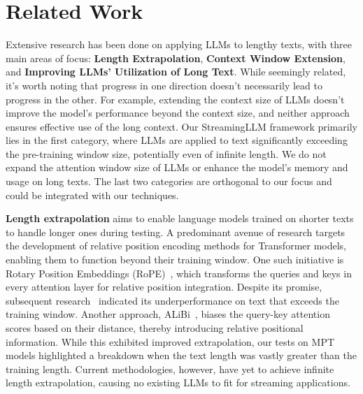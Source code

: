 \documentclass{article} \usepackage{iclr2024_conference,times}
\def\method{StreamingLLM\xspace}
\begin{document}
\section{Related Work}
\vspace{-0.5em}
Extensive research has been done on applying LLMs to lengthy texts, with three main areas of focus: \textbf{Length Extrapolation}, \textbf{Context Window Extension}, and \textbf{Improving LLMs' Utilization of Long Text}. While seemingly related, it's worth noting that progress in one direction doesn't necessarily lead to progress in the other. For example, extending the context size of LLMs doesn't improve the model's performance beyond the context size, and neither approach ensures effective use of the long context. Our \method framework primarily lies in the first category, where LLMs are applied to text significantly exceeding the pre-training window size, potentially even of infinite length. We do not expand the attention window size of LLMs or enhance the model's memory and usage on long texts. The last two categories are orthogonal to our focus and could be integrated with our techniques.

\textbf{Length extrapolation} aims to enable language models trained on shorter texts to handle longer ones during testing. A predominant avenue of research targets the development of relative position encoding methods for Transformer models, enabling them to function beyond their training window. One such initiative is Rotary Position Embeddings (RoPE)~\citep{su2021roformer}, which transforms the queries and keys in every attention layer for relative position integration. Despite its promise, subsequent research~\citep{alibi, chen2023extending} indicated its underperformance on text that exceeds the training window. Another approach, ALiBi~\citep{alibi}, biases the query-key attention scores based on their distance, thereby introducing relative positional information. While this exhibited improved extrapolation, our tests on MPT models highlighted a breakdown when the text length was vastly greater than the training length. Current methodologies, however, have yet to achieve infinite length extrapolation, causing no existing LLMs to fit for streaming applications.
\end{document}
